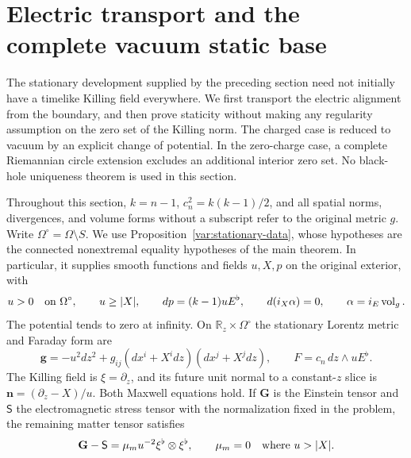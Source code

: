 \section{Electric transport and the complete vacuum static base}
\label{stat:section}

The stationary development supplied by the preceding section need not
initially have a timelike Killing field everywhere.  We first transport
the electric alignment from the boundary, and then prove staticity
without making any regularity assumption on the zero set of the Killing
norm.  The charged case is reduced to vacuum by an explicit change of
potential.  In the zero-charge case, a complete Riemannian circle
extension excludes an additional interior zero set.  No black-hole
uniqueness theorem is used in this section.

Throughout this section, $k=n-1$, $c_n^2=k(k-1)/2$, and all spatial
norms, divergences, and volume forms without a subscript refer to the
original metric $g$.  Write $\Omega^\circ=\Omega\setminus S$.  We use
Proposition~\ref{var:stationary-data}, whose hypotheses are the
connected nonextremal equality hypotheses of the main theorem.  In
particular, it supplies smooth functions and fields $u,X,p$ on the
original exterior, with
\begin{equation}
 u>0\quad\hbox{on }\Omega^\circ,\qquad
 u\geq |X|,\qquad
 dp=(k-1)uE^\flat,\qquad
 d(i_X\alpha)=0,\qquad \alpha=i_E\operatorname{vol}_g.
 \label{stat:interface-fields}
\end{equation}
The potential tends to zero at infinity.  On
$\mathbb R_z\times\Omega^\circ$ the stationary Lorentz metric and
Faraday form are
\begin{equation}
 \mathbf g=-u^2dz^2+g_{ij}(dx^i+X^i dz)(dx^j+X^j dz),\qquad
 F=c_n\,dz\wedge uE^\flat.
 \label{stat:stationary-metric}
\end{equation}
The Killing field is $\xi=\partial_z$, and its future unit normal to a
constant-$z$ slice is $\mathbf n=(\partial_z-X)/u$.  Both Maxwell
equations hold.  If $\mathbf G$ is the Einstein tensor and $\mathsf S$
the electromagnetic stress tensor with the normalization fixed in the
problem, the remaining matter tensor satisfies
\begin{equation}
 \mathbf G-\mathsf S
   =\mu_m u^{-2}\xi^\flat\otimes\xi^\flat,
 \qquad \mu_m=0\quad\hbox{where }u>|X|.
 \label{stat:remaining-matter}
\end{equation}

